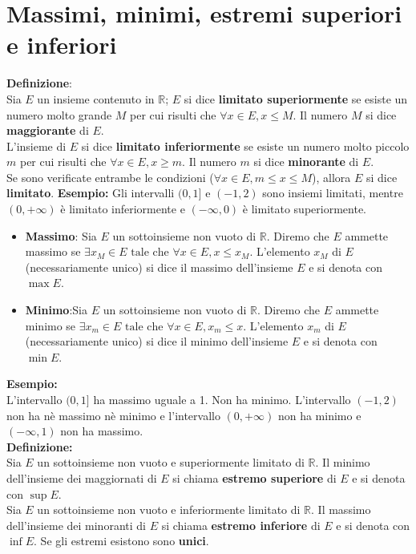 \documentclass[12pt, a4paper]{report}
\begin{document}
    \section{Massimi, minimi, estremi superiori e inferiori}
    \textbf{Definizione}:\\
     Sia $E$ un insieme contenuto in $\mathbb{R}$; $E$ si dice \textbf{limitato superiormente} se esiste un numero molto grande $M$ per cui risulti che $\forall x \in E, x\leq M$. Il numero $M$ si dice \textbf{maggiorante} di $E$.\\
    L'insieme di $E$ si dice \textbf{limitato inferiormente} se esiste un numero molto piccolo $m$ per cui risulti che $\forall x \in E, x\geq m$. Il numero $m$ si dice \textbf{minorante} di $E$.\\
    Se sono verificate entrambe le condizioni ($\forall x \in E, m\leq x \leq M$), allora $E$ si dice \textbf{limitato}.
    \textbf{Esempio:}
    Gli intervalli $(0,1]$ e $(-1,2)$ sono insiemi limitati, mentre $(0,+\infty)$ è limitato inferiormente e $(-\infty,0)$ è limitato superiormente.
    \begin{itemize}
        \item \textbf{Massimo}: Sia $E$ un sottoinsieme non vuoto di $\mathbb{R}$. Diremo che $E$ ammette massimo se $\exists x_{M}\in E \text{ tale che } \forall x \in E, x \leq x_{M}$.  L'elemento $x_{M}$ di $E$ (necessariamente unico) si dice il massimo dell'insieme $E$ e si denota con $\max E$.
        \item \textbf{Minimo}:Sia $E$ un sottoinsieme non vuoto di $\mathbb{R}$. Diremo che $E$ ammette minimo se $\exists x_{m}\in E \text{ tale che } \forall x \in E, x_{m} \leq x$.  L'elemento $x_{m}$ di $E$ (necessariamente unico) si dice il minimo dell'insieme $E$ e si denota con $\min E$.
    \end{itemize}
    \textbf{Esempio:}\\
    L'intervallo $(0,1]$ ha massimo uguale a 1. Non ha minimo. L'intervallo $(-1,2)$ non ha nè massimo nè minimo e l'intervallo $(0,+\infty)$ non ha minimo e $(-\infty,1)$ non ha massimo.\\
    \textbf{Definizione:}\\
    Sia $E$ un sottoinsieme non vuoto e superiormente limitato di $\mathbb{R}$. Il minimo dell'insieme dei maggiornati di $E$ si chiama \textbf{estremo superiore} di $E$ e si denota con $\sup E$.\\
    Sia $E$ un sottoinsieme non vuoto e inferiormente limitato di $\mathbb{R}$. Il massimo dell'insieme dei minoranti di $E$ si chiama \textbf{estremo inferiore} di $E$ e si denota con $\inf E$. Se gli estremi esistono sono \textbf{unici}.
\end{document}
